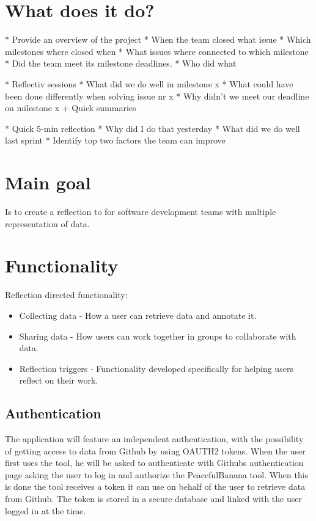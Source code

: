 \section{What does it do?}
* Provide an overview of the project
* When the team closed what issue
* Which milestones where closed when
* What issues where connected to which milestone
* Did the team meet its milestone deadlines.
* Who did what

* Reflectiv sessions
	* What did we do well in milestone x
	* What could have been done differently when solving issue nr x
	* Why didn't we meet our deadline on milestone x
	+ Quick summaries

* Quick 5-min reflection
	* Why did I do that yesterday
	* What did we do well last sprint
	* Identify top two factors the team can improve


\section{Main goal}
Is to create a reflection to for software development teams with multiple representation of data. %

\section{Functionality}

Reflection directed functionality:
\begin{itemize}
\item Collecting data - How a user can retrieve data and annotate it. 
\item Sharing data - How users can work together in groups to collaborate with data. 
\item Reflection triggers - Functionality developed specifically for helping users reflect on their work.
\end{itemize}

\subsection{Authentication}
The application will feature an independent authentication, with the possibility of getting access to data from Github by using OAUTH2 tokens. When the user first uses the tool, he will be asked to authenticate with Githubs authentication page asking the user to log in and authorize the PeacefulBanana tool. When this is done the tool receives a token it can use on behalf of the user to retrieve data from Github. The token is stored in a secure database and linked with the user logged in at the time. 

